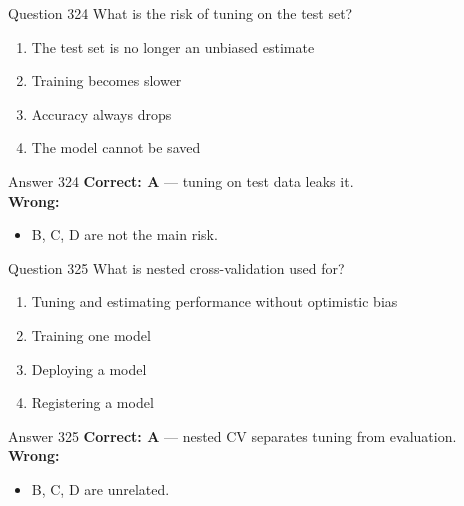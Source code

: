 \documentclass[aspectratio=169,11pt]{beamer}
\begin{document}
	\begin{frame}{Question 324}
		What is the risk of tuning on the test set?
		\begin{enumerate}[label=\Alph*.]
			\item The test set is no longer an unbiased estimate
			\item Training becomes slower
			\item Accuracy always drops
			\item The model cannot be saved
		\end{enumerate}
	\end{frame}
	\begin{frame}{Answer 324}
		\textbf{Correct: A} --- tuning on test data leaks it.\\
		\vspace{0.5em}
		\textbf{Wrong:}
		\begin{itemize}
			\item B, C, D are not the main risk.
		\end{itemize}
	\end{frame}
	
	\begin{frame}{Question 325}
		What is nested cross-validation used for?
		\begin{enumerate}[label=\Alph*.]
			\item Tuning and estimating performance without optimistic bias
			\item Training one model
			\item Deploying a model
			\item Registering a model
		\end{enumerate}
	\end{frame}
	\begin{frame}{Answer 325}
		\textbf{Correct: A} --- nested CV separates tuning from evaluation.\\
		\vspace{0.5em}
		\textbf{Wrong:}
		\begin{itemize}
			\item B, C, D are unrelated.
		\end{itemize}
	\end{frame}
	
\end{document}
